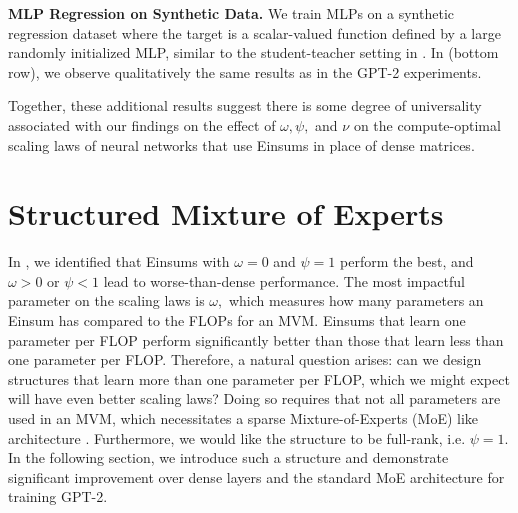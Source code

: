 \documentclass{article}
\begin{document}
 \noindent \textbf{MLP Regression on Synthetic Data.} \quad
We train MLPs on a synthetic regression dataset where the target is a scalar-valued function defined by a large randomly initialized MLP, similar to the student-teacher setting in \citep{bahri2021explaining}. In  (bottom row), we observe qualitatively the same results as in the GPT-2 experiments.

Together, these additional results suggest there is some degree of universality associated with our findings on the effect of $\omega, \psi, $ and $\nu$ on the compute-optimal scaling laws of neural networks that use Einsums in place of dense matrices.


\section{Structured Mixture of Experts}\label{sec:moe}
In , we identified that Einsums with $\omega=0$ and $\psi=1$ perform the best, and $\omega > 0$ or $\psi < 1$ lead to worse-than-dense performance. The most impactful parameter on the scaling laws is $\omega,$ which measures how many parameters an Einsum has compared to the FLOPs for an MVM. Einsums that learn one parameter per FLOP perform significantly better than those that learn less than one parameter per FLOP. Therefore, a natural question arises: can we design structures that learn more than one parameter per FLOP, which we might expect will have even better scaling laws? Doing so requires that not all parameters are used in an MVM, which necessitates a sparse Mixture-of-Experts (MoE) like architecture \citep{shazeer2017outrageously, fedus2022switch, jiang2024mixtral}. Furthermore, we would like the structure to be full-rank, i.e. $\psi = 1.$ In the following section, we introduce such a structure and demonstrate significant improvement over dense layers and the standard MoE architecture for training GPT-2.
\end{document}

